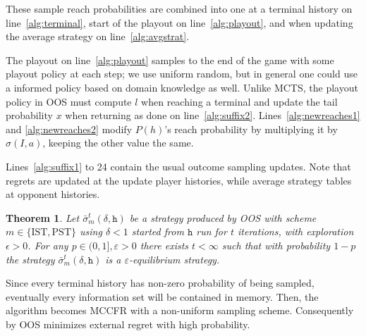 \documentclass[letterpaper]{article}
\newcommand{\cP}{\mathcal{P}}
\newcommand{\tth}{\mathtt{h}}
\newtheorem{theorem}{Theorem}
\newcounter{mlNoteCounter}
\newcommand{\mlnote}[1]{{\scriptsize \color{darkgreen} $\blacksquare$ \refstepcounter{mlNoteCounter}\textsf{[ML]$_{\arabic{mlNoteCounter}}$:{#1}}}}
\begin{document}
These sample reach probabilities are combined into one at a terminal history on line~\ref{alg:terminal}, 
start of the playout on line~\ref{alg:playout}, and when updating the average 
strategy on line~\ref{alg:avgstrat}. 


The playout on line~\ref{alg:playout} samples to the end of the game with some playout policy at each step; we use uniform random, 
but in general one could use a informed policy based on domain knowledge as well. 
Unlike MCTS, the playout policy in OOS must compute $l$ when reaching a terminal and update the tail probability $x$ when returning
as done on line~\ref{alg:suffix2}. Lines~\ref{alg:newreaches1} and \ref{alg:newreaches2} modify $P(h)$'s reach probability 
by multiplying it by $\sigma(I,a)$, keeping the other value the same.

Lines~\ref{alg:suffix1} to 24
contain the usual outcome sampling updates. Note that regrets are updated at the 
update player histories, while average strategy tables at opponent histories. 

\begin{theorem}
Let $\bar{\sigma}^t_m(\delta,\tth)$ be a strategy produced by OOS with scheme $m \in \{ \mbox{IST}, \mbox{PST} \}$ 
using $\delta < 1$ started from $\tth$ run for $t$ iterations, with exploration $\epsilon > 0$.  
For any $p \in (0, 1], \varepsilon > 0$ there exists $t < \infty$ such that with 
probability $1-p$ the strategy  $\bar{\sigma}^t_m(\delta,\tth)$ is a $\varepsilon$-equilibrium strategy. 
\label{thm:consistency}
\end{theorem}
Since every terminal history has non-zero probability of being sampled, eventually every information 
set will be contained in memory. Then, the algorithm becomes MCCFR with a non-uniform sampling scheme.
Consequently by \cite[Theorem 5]{Lanctot09Sampling} OOS minimizes external regret with high probability.
\end{document}
